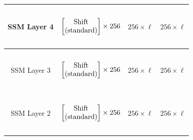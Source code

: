\begin{table}[]
\begin{tabular}{@{}c|c|c|c@{}}
SSM Layer 4 & \begin{math}\begin{aligned}    \begin{matrix}    \text{\phantom{-}} \\    \end{matrix}    \\    \begin{bmatrix}    \text{\phantom{-} Shift \phantom{-}}  \\ \text{(standard)} \\    \end{bmatrix}    \times 256     \\    \begin{matrix}    \text{\phantom{-}} \\    \end{matrix}    \\\end{aligned}\end{math}              & $256 \times \ell$ & $256 \times \ell$ \\ \midrule
SSM Layer 3 & \begin{math}\begin{aligned}    \begin{matrix}    \text{\phantom{-}} \\    \end{matrix}    \\    \begin{bmatrix}    \text{\phantom{-} Shift \phantom{-}} \\ \text{(standard)} \\    \end{bmatrix}    \times 256     \\    \begin{matrix}    \text{\phantom{-}} \\    \end{matrix}    \\\end{aligned}\end{math}              & $256 \times \ell$ & $256 \times \ell$ \\ \midrule
SSM Layer 2 & \begin{math}\begin{aligned}    \begin{matrix}    \text{\phantom{-}} \\    \end{matrix}    \\    \begin{bmatrix}    \text{\phantom{-} Shift \phantom{-}} \\ \text{(standard)} \\    \end{bmatrix}    \times 256     \\    \begin{matrix}    \text{\phantom{-}} \\    \end{matrix}    \\\end{aligned}\end{math}              & $256 \times \ell$ & $256 \times \ell$ \\ \midrule

\end{tabular}
\end{table}
